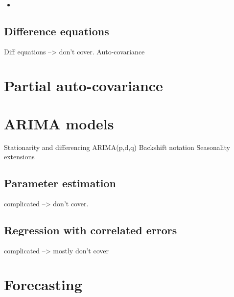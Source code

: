 \documentclass{article}
\begin{document}
\begin{itemize}
\item 
\end{itemize}

\subsection{Difference equations}

Diff equations --> don't cover.
Auto-covariance

\section{Partial auto-covariance}

\section{ARIMA models}

Stationarity and differencing
ARIMA(p,d,q)
Backshift notation
Seasonality extensions

\subsection{Parameter estimation}

complicated --> don't cover.

\subsection{Regression with correlated errors}

complicated --> mostly don't cover

\section{Forecasting}
\end{document}
